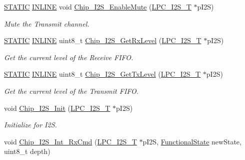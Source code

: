 \begin{DoxyCompactItemize}
\hyperlink{group__LPC__Types__Public__Macros_ga10b2d890d871e1489bb02b7e70d9bdfb}{S\+T\+A\+T\+IC} \hyperlink{group__LPC__Types__Public__Types_ga2eb6f9e0395b47b8d5e3eeae4fe0c116}{I\+N\+L\+I\+NE} void \hyperlink{group__I2S__17XX__40XX_ga3977adf6afb42ea9da7c764ef36efa6e}{Chip\+\_\+\+I2\+S\+\_\+\+Enable\+Mute} (\hyperlink{structLPC__I2S__T}{L\+P\+C\+\_\+\+I2\+S\+\_\+T} $\ast$p\+I2S)
\begin{DoxyCompactList}\small\item\em Mute the Transmit channel. \end{DoxyCompactList}\item 
\hyperlink{group__LPC__Types__Public__Macros_ga10b2d890d871e1489bb02b7e70d9bdfb}{S\+T\+A\+T\+IC} \hyperlink{group__LPC__Types__Public__Types_ga2eb6f9e0395b47b8d5e3eeae4fe0c116}{I\+N\+L\+I\+NE} uint8\+\_\+t \hyperlink{group__I2S__17XX__40XX_ga5880b341bea64ea33e734af422b43dc3}{Chip\+\_\+\+I2\+S\+\_\+\+Get\+Rx\+Level} (\hyperlink{structLPC__I2S__T}{L\+P\+C\+\_\+\+I2\+S\+\_\+T} $\ast$p\+I2S)
\begin{DoxyCompactList}\small\item\em Get the current level of the Receive F\+I\+FO. \end{DoxyCompactList}\item 
\hyperlink{group__LPC__Types__Public__Macros_ga10b2d890d871e1489bb02b7e70d9bdfb}{S\+T\+A\+T\+IC} \hyperlink{group__LPC__Types__Public__Types_ga2eb6f9e0395b47b8d5e3eeae4fe0c116}{I\+N\+L\+I\+NE} uint8\+\_\+t \hyperlink{group__I2S__17XX__40XX_ga125559c7f810a2564f5b6059ead42256}{Chip\+\_\+\+I2\+S\+\_\+\+Get\+Tx\+Level} (\hyperlink{structLPC__I2S__T}{L\+P\+C\+\_\+\+I2\+S\+\_\+T} $\ast$p\+I2S)
\begin{DoxyCompactList}\small\item\em Get the current level of the Transmit F\+I\+FO. \end{DoxyCompactList}\item 
void \hyperlink{group__I2S__17XX__40XX_ga006752f0240a956ae02fba521e63c053}{Chip\+\_\+\+I2\+S\+\_\+\+Init} (\hyperlink{structLPC__I2S__T}{L\+P\+C\+\_\+\+I2\+S\+\_\+T} $\ast$p\+I2S)
\begin{DoxyCompactList}\small\item\em Initialize for I2S. \end{DoxyCompactList}\item 
void \hyperlink{group__I2S__17XX__40XX_ga36b0f5c62d5c703c1374bdcc0d84d07f}{Chip\+\_\+\+I2\+S\+\_\+\+Int\+\_\+\+Rx\+Cmd} (\hyperlink{structLPC__I2S__T}{L\+P\+C\+\_\+\+I2\+S\+\_\+T} $\ast$p\+I2S, \hyperlink{group__LPC__Types__Public__Types_gac9a7e9a35d2513ec15c3b537aaa4fba1}{Functional\+State} new\+State, uint8\+\_\+t depth)

\end{DoxyCompactItemize}

